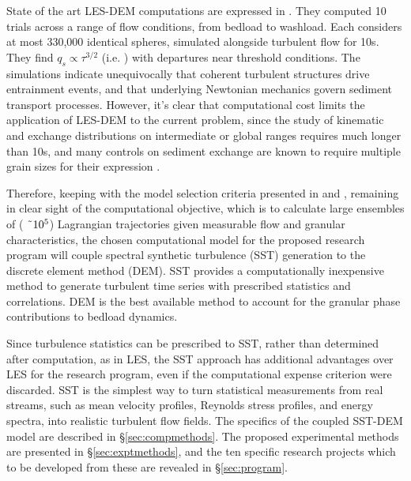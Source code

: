 State of the art LES-DEM computations are expressed in \cite{Elghannay2017}. They computed 10 trials across a range of flow conditions, from bedload to washload. Each considers at most 330,000 identical spheres, simulated alongside turbulent flow for 10s. They find $q_s \propto \tau^{3/2}$ (i.e. \cite{Meyer-Peter1948}) with departures near threshold conditions. The simulations indicate unequivocally that coherent turbulent structures drive entrainment events, and that underlying Newtonian mechanics govern sediment transport processes. However, it's clear that computational cost limits the application of LES-DEM to the current problem, since the study of kinematic and exchange distributions on intermediate or global ranges requires much longer than 10s, and many controls on sediment exchange are known to require multiple grain sizes for their expression \citep[e.g.][]{Parker1982, Brayshaw1984}.  
\bigskip 

Therefore, keeping with the model selection criteria presented in \cite{Larsen2016} and \cite{Murray2003}, remaining in clear sight of the computational objective, which is to calculate large ensembles of ( $\char`\~ 10^5$) Lagrangian trajectories given measurable flow and granular characteristics, the chosen computational model for the proposed research program will couple spectral synthetic turbulence (SST) generation to the discrete element method (DEM). SST provides a computationally inexpensive method to generate turbulent time series with prescribed statistics and correlations. DEM is the best available method to account for the granular phase contributions to bedload dynamics.
\bigskip 

Since turbulence statistics can be prescribed to SST, rather than determined after computation, as in LES, the SST approach has additional advantages over LES for the research program, even if the computational expense criterion were discarded. SST is the simplest way to turn statistical measurements from real streams, such as mean velocity profiles, Reynolds stress profiles, and energy spectra, into realistic turbulent flow fields. The specifics of the coupled SST-DEM model are described in \S \ref{sec:compmethods}. The proposed experimental methods are presented in \S \ref{sec:exptmethods}, and the ten specific research projects which to be developed from these are revealed in \S \ref{sec:program}.
\bigskip 



